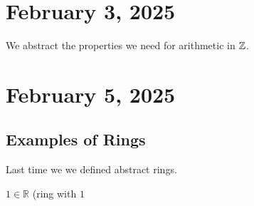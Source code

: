 \documentclass[11pt, draft]{article}
\begin{document}

\section{February 3, 2025}
We abstract the properties we need for arithmetic in \(\mathbb Z\).
\section{February 5, 2025}

\subsection{Examples of Rings}
Last time we we defined abstract rings.
\begin{remark}
    \(1 \in \mathbb{R}\) (ring with \(1\)
\end{remark}
\end{document}
